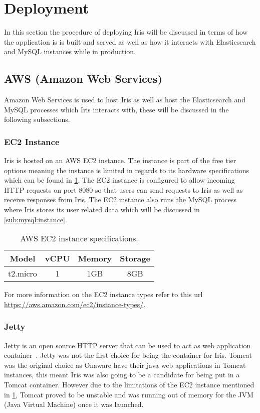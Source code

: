 \documentclass[12pt,a4paper,titlepage]{report}
\begin{document}
\section{Deployment}
In this section the procedure of deploying Iris will be discussed in terms of how the application is is built and served as well as how it interacts with Elasticsearch and MySQL instances while in production.
\subsection{AWS (Amazon Web Services)}
Amazon Web Services is used to host Iris as well as host the Elasticsearch and MySQL processes which Iris interacts with, these will be discussed in the following subsections.
\subsubsection{EC2 Instance}
\label{sub:ec2}
Iris is hosted on an AWS EC2 instance. The instance is part of the free tier options meaning the instance is limited in regards to its hardware specifications which can be found in \cref{table:ec2:specs}. The EC2 instance is configured to allow incoming HTTP requests on port 8080 so that users can send requests to Iris as well as receive responses from Iris. The EC2 instance also runs the MySQL process where Iris stores its user related data which will be discussed in \cref{sub:mysql:instance}.
\begin{table}[H]
\centering
\small
\setlength\tabcolsep{6pt}
 \begin{tabular}{|c|c|c|c|}
 \hline
 Model & vCPU & Memory & Storage\\
 \hline\hline
 t2.micro & 1 & 1GB & 8GB\\ 
 \hline
\end{tabular}
\caption{AWS EC2 instance specifications.}
\label{table:ec2:specs}
\end{table}

For more information on the EC2 instance types refer to this url \url{https://aws.amazon.com/ec2/instance-types/}.

\subsubsection{Jetty}
Jetty is an open source HTTP server that can be used to act as web application container~\parencite{Jetty}. Jetty was not the first choice for being the container for Iris. Tomcat was the original choice as Onaware have their java web applications in Tomcat instances, this meant Iris was also going to be a candidate for being put in a Tomcat container. However due to the limitations of the EC2 instance mentioned in \cref{table:ec2:specs}, Tomcat proved to be unstable and was running out of memory for the JVM (Java Virtual Machine) once it was launched. 
\end{document}

